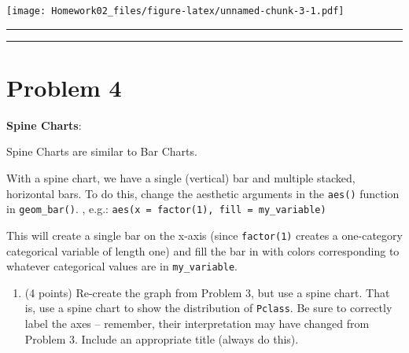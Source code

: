 \documentclass[]{article}
\newenvironment{Shaded}{\begin{snugshade}}{\end{snugshade}}
\newcommand{\DataTypeTok}[1]{\textcolor[rgb]{0.13,0.29,0.53}{#1}}
\newcommand{\KeywordTok}[1]{\textcolor[rgb]{0.13,0.29,0.53}{\textbf{#1}}}
\newcommand{\NormalTok}[1]{#1}
\newcommand{\OperatorTok}[1]{\textcolor[rgb]{0.81,0.36,0.00}{\textbf{#1}}}
\newcommand{\StringTok}[1]{\textcolor[rgb]{0.31,0.60,0.02}{#1}}
\providecommand{\tightlist}{%
  \setlength{\itemsep}{0pt}\setlength{\parskip}{0pt}}
\begin{document}
\begin{Shaded}
\end{Shaded}

\texttt{[image: Homework02\_files/figure-latex/unnamed-chunk-3-1.pdf]}

\begin{center}\rule{0.5\linewidth}{\linethickness}\end{center}

\begin{center}\rule{0.5\linewidth}{\linethickness}\end{center}

\hypertarget{problem-4}{%
\section{Problem 4}\label{problem-4}}

\textbf{Spine Charts}:

Spine Charts are similar to Bar Charts.

With a spine chart, we have a single (vertical) bar and multiple
stacked, horizontal bars. To do this, change the aesthetic arguments in
the \texttt{aes()} function in \texttt{geom\_bar()}. , e.g.:
\texttt{aes(x\ =\ factor(1),\ fill\ =\ my\_variable)}

This will create a single bar on the x-axis (since \texttt{factor(1)}
creates a one-category categorical variable of length one) and fill the
bar in with colors corresponding to whatever categorical values are in
\texttt{my\_variable}.

\begin{enumerate}
\def\labelenumi{\alph{enumi}.}
\tightlist
\item
  (4 points) Re-create the graph from Problem 3, but use a spine chart.
  That is, use a spine chart to show the distribution of
  \texttt{Pclass}. Be sure to correctly label the axes -- remember,
  their interpretation may have changed from Problem 3. Include an
  appropriate title (always do this).
\end{enumerate}
\end{document}
